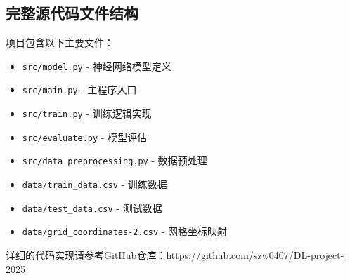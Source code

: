 \documentclass{article}
\begin{document}
\subsection{完整源代码文件结构}

项目包含以下主要文件：

\begin{itemize}
    \item \texttt{src/model.py} - 神经网络模型定义
    \item \texttt{src/main.py} - 主程序入口
    \item \texttt{src/train.py} - 训练逻辑实现
    \item \texttt{src/evaluate.py} - 模型评估
    \item \texttt{src/data\_preprocessing.py} - 数据预处理
    \item \texttt{data/train\_data.csv} - 训练数据
    \item \texttt{data/test\_data.csv} - 测试数据
    \item \texttt{data/grid\_coordinates-2.csv} - 网格坐标映射
\end{itemize}

详细的代码实现请参考GitHub仓库：\url{https://github.com/szw0407/DL-project-2025}
\end{document}
